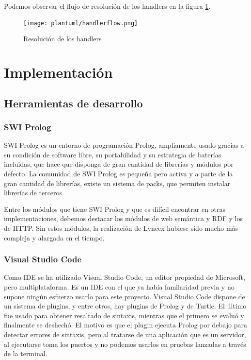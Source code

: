 \documentclass[openright,twoside,12pt]{book}
\begin{document}
Podemos observar el flujo de resolución de los handlers en la figura \ref{fig:handlerflow}.

\begin{figure}
    \centering
    \texttt{[image: plantuml/handlerflow.png]}
    \caption{Resolución de los handlers}
    \label{fig:handlerflow}
\end{figure}

\chapter{Implementación}

\section{Herramientas de desarrollo}
\subsection{SWI Prolog}
SWI Prolog\cite{prolog} es un entorno de programación Prolog, ampliamente usado gracias a su condición de software libre, su portabilidad y 
su estrategia de baterías incluidas, que hace que disponga de gran cantidad de librerías y módulos por defecto.
La comunidad de SWI Prolog es pequeña pero activa y a parte de la gran cantidad de librerías, existe un sistema de packs, que permiten instalar librerías de terceros.

Entre los módulos que tiene SWI Prolog y que es difícil encontrar en otras implementaciones, debemos destacar los módulos de web semántica y RDF y los de HTTP.
Sin estos módulos, la realización de Lyncex hubiese sido mucho más compleja y alargada en el tiempo.

\subsection{Visual Studio Code}
Como IDE se ha utilizado Visual Studio Code\cite{vscode}, un editor propiedad de Microsoft, pero multiplataforma.
Es un IDE con el que ya había familaridad previa y no supone ningún esfuerzo usarlo para este proyecto.
Visual Studio Code dispone de un sistema de plugins, y entre otros, hay plugins de Prolog y de Turtle.
El último fue usado para obtener resaltado de sintaxis, mientras que el primero se evaluó y finalmente se deshechó.
El motivo es que el plugin ejecuta Prolog por debajo para detectar errores de sintaxis, pero al tratarse de una aplicación que es un servidor, al ejecutarse toma los puertos y no podemos usarlos
en pruebas lanzadas a través de la terminal.
\end{document}
